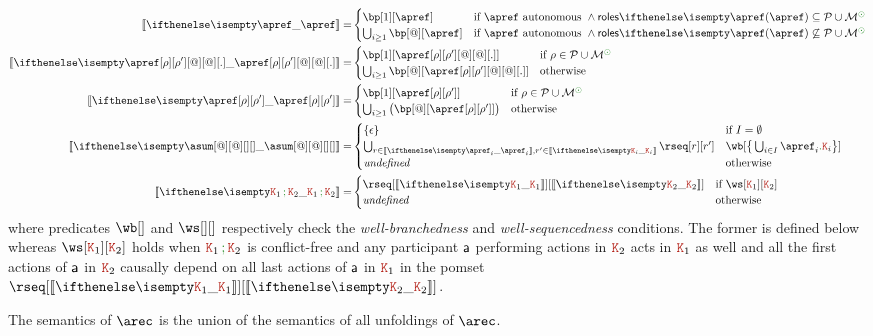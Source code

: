 \begin{align*}
  \ksem{\apref} =
  &
    \begin{cases}
      \bp[1][\apref]
      & \text{if $\apref$ autonomous } \land \roles{\apref} \subseteq \participants \cup \multiroles^\unknownop
      \\
      \bigcup_{i \geq 1}\bp[@][\apref]
      & \text{if $\apref$ autonomous } \land \roles{\apref} \not\subseteq \participants \cup \multiroles^\unknownop
    \end{cases}
  \\
  \ksem{\apref[\arole][\arole'][@][@][.]} =
  &
    \begin{cases}
      \bp[1][{\apref[\arole][\arole'][@][@][.]}]
      & \text{if } \arole \in \participants \cup \multiroles^\unknownop
      \\
      \bigcup_{i \geq 1}\bp[@][{\apref[\arole][\arole'][@][@][.]}]
      & \text{otherwise}
    \end{cases}
  \\
  \ksem{\apref[\arole][\arole']} =
  &
    \begin{cases}
      \bp[1][{\apref[\arole][\arole']}]
      & \text{if } \arole \in \participants \cup \multiroles^\unknownop
      \\
      \bigcup_{i \geq 1}\big(\bp[@][{\apref[\arole][\arole']}]\big)
      & \text{otherwise}
    \end{cases}
  \\
  \ksem{\asum[@][@][][]} =
  &
    \begin{cases}
      \{ \emptypom \} & \text{if } I = \emptyset
      \\
      \bigcup_{\apom \in \ksem{\apref_i},\apom' \in \ksem{\aK_i}} \rseq[\apom][\apom']
      & \wb[{\big\{\bigcup_{i \in I}\apref_i\mkop{.}\aK_i\big\}}]
      \\
      \mathit{undefined} & \text{otherwise}
    \end{cases}
  \\
  \ksem{\aK_1 \seqop \aK_2} =
  &
    \begin{cases}
      \rseq[\ksem{\aK_1}][\ksem{\aK_2}] & \text{if } \ws[\aK_1][\aK_2]
      \\
      \mathit{undefined} & \text{otherwise}
    \end{cases}
\end{align*}
where predicates $\wb[]$ and $\ws[][]$ respectively check the
\emph{well-branchedness} and \emph{well-sequencedness} conditions.
%
The former is defined below whereas $\ws[\aK_1][\aK_2]$ holds when
$\aK_1 \seqop \aK_2$ is conflict-free and any participant $\ptp a$
performing actions in $\aK_2$ acts in $\aK_1$ as well and all the
first actions of $\ptp a$ in $\aK_2$ causally depend on all last
actions of $\ptp a$ in $\aK_1$ in the pomset
$\rseq[\ksem{\aK_1}][{\ksem{\aK_2}}]$.

  
The semantics of $\arec$ is the union of the semantics of all
unfoldings of $\arec$.

\hsl



